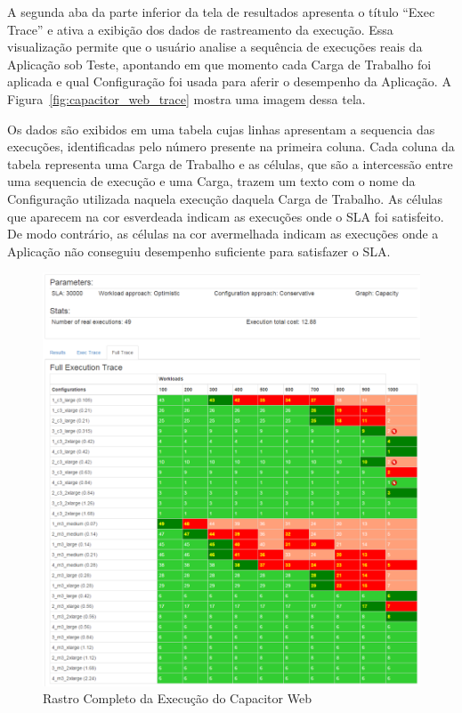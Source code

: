 A segunda aba da parte inferior da tela de resultados apresenta o título 
``Exec Trace'' e ativa a exibição dos dados de rastreamento da execução. Essa
visualização permite que o usuário analise a sequência de execuções reais da 
Aplicação sob Teste, apontando em que momento cada Carga de Trabalho foi aplicada
e qual Configuração foi usada para aferir o desempenho da Aplicação. A 
Figura~\ref{fig:capacitor_web_trace} mostra uma imagem dessa tela.

Os dados são exibidos em uma tabela cujas linhas apresentam a sequencia das 
execuções, identificadas pelo número presente na primeira coluna. Cada coluna da
tabela representa uma Carga de Trabalho e as células, que são a intercessão entre
uma sequencia de execução e uma Carga, trazem um texto com o nome da Configuração 
utilizada naquela execução daquela Carga de Trabalho. As células que aparecem na 
cor esverdeada indicam as execuções onde o SLA foi satisfeito. De modo contrário, 
as células na cor avermelhada indicam as execuções onde a Aplicação não conseguiu 
desempenho suficiente para satisfazer o SLA.
 
\begin{figure}[htb]
  \caption{\label{fig:capacitor_web_fulltrace}Rastro Completo da Execução do Capacitor Web}
  \begin{center}
    \includegraphics[scale=0.5]{img/CapacitorWeb_FullTrace}
  \end{center}
\end{figure}

